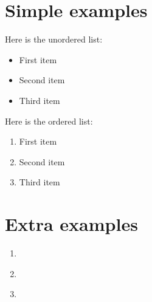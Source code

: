 \documentclass[12pt]{article}
\begin{document}
\section{Simple examples}

Here is the unordered list:
\begin{itemize}
    \item First item
    \item Second item
    \item Third item
\end{itemize}

Here is the ordered list:
\begin{enumerate}
    \item First item
    \item Second item
    \item Third item
\end{enumerate}



\section{Extra examples}

\begin{enumerate}
    \item \blindtext
    \item \textcolor{red}{\blindtext}
    \item \blindtext
\end{enumerate}
\end{document}
